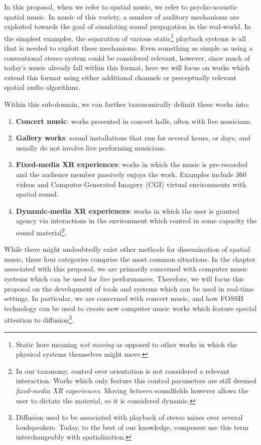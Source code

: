 In this proposal, when we refer to spatial music, we refer to psycho-acoustic spatial music. In music of this variety, a number of auditory mechanisms are exploited towards the goal of simulating sound propagation in the real-world. In the simplest examples, the separation of various static\footnote{Static here meaning \textit{not moving} as opposed to other works in which the physical systems themselves might move.} playback systems is all that is needed to exploit these mechanisms. Even something as simple as using a conventional stereo system could be considered relevant, however, since much of today's music already fall within this format, here we will focus on works which extend this format using either additional channels or perceptually relevant spatial audio algorithms. 

Within this sub-domain, we can further taxonomically delimit these works into:
\begin{enumerate}
    \item \textbf{Concert music}: works presented in concert halls, often with live musicians. 
    \item \textbf{Gallery works}: sound installations that run for several hours, or days, and usually do not involve live performing musicians. 
    \item \textbf{Fixed-media XR experiences}: works in which the music is pre-recorded and the audience member passively enjoys the work. Examples include 360 videos and Computer-Generated Imagery (CGI) virtual environments with spatial sound. 
    \item \textbf{Dynamic-media XR experiences}: works in which the user is granted agency via interactions in the environment which control in some capacity the sound material\footnote{In our taxonomy, control over orientation is not considered a relevant interaction. Works which only feature this control parameters are still deemed \textit{fixed-media XR experiences}. Moving \textit{between} soundfields however allows the user to dictate the material, so it is considered dynamic.}.
\end{enumerate}

While there might undoubtedly exist other methods for dissemination of spatial music, these four categories comprise the most common situations. In the chapter associated with this proposal, we are primarily concerned with computer music systems which can be used for \textit{live} performances. Therefore, we will focus this proposal on the development of tools and systems which can be used in real-time settings. In particular, we are concerned with concert music, and how FOSSH technology can be used to create new computer music works which feature special attention to diffusion\footnote{Diffusion used to be associated with playback of stereo mixes over several loudspeakers. Today, to the best of our knowledge, composers use this term interchangeably with spatialization.}.


